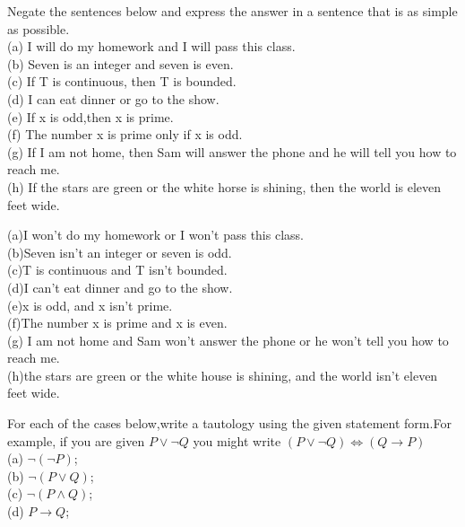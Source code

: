 \documentclass[11pt, a4paper, UTF8]{ctexart}
\begin{document}
\begin{problem}[UD: 2.6]
Negate the sentences below and express the answer in a sentence that is as simple as possible.\\
(a) I will do my homework and I will pass this class. \\
(b) Seven is an integer and seven is even.\\
(c) If T is continuous, then T is bounded.\\
(d) I can eat dinner or go to the show.\\
(e) If x is odd,then x is prime.\\
(f) The number x is prime only if x is odd.\\
(g) If I am not home, then Sam will answer the phone and he will tell you how to reach me.\\
(h) If the stars are green or the white horse is shining, then the world is eleven feet wide.
\end{problem}


\begin{solution}
  (a)I won't do my homework or I won't pass this class.\\
  (b)Seven isn't an integer or seven is odd.\\
  (c)T is continuous and T isn't bounded.\\
  (d)I can't eat dinner and go to the show.\\
  (e)x is odd, and x isn't prime.\\
  (f)The number x is prime and x is even.\\
  (g) I am not home and  Sam won't answer the phone or he won't tell you how to reach me.\\
  (h)the stars are green or the white house is shining, and the world isn't eleven feet wide.\\
\end{solution}




\begin{problem}[UD:2.7]
For each of the cases below,write a tautology using the given statement form.For example, if you are given $P \vee \neg Q$ you might write $(P \vee \neg Q) \Leftrightarrow (Q \rightarrow P)$\\
(a) $\neg(\neg P)$;\\
(b) $\neg(P \vee Q)$;\\
(c) $\neg(P \wedge Q)$;\\
(d) $P \rightarrow Q$;
\end{problem}
\end{document}
